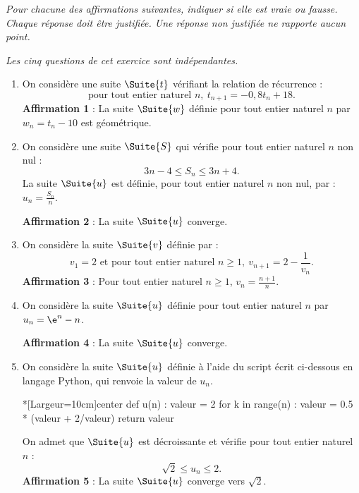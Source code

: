 \textit{Pour chacune des affirmations suivantes, indiquer si elle est vraie ou fausse. Chaque réponse doit être justifiée. Une réponse non justifiée ne rapporte aucun point.}

\smallskip

\textit{Les cinq questions de cet exercice sont indépendantes.}

\begin{enumerate}
	\item On considère une suite $\Suite{t}$ vérifiant la relation de récurrence : \[ \text{pour tout entier naturel } n,~t_{n+1}=-0,8t_n+18. \]
	\textbf{Affirmation 1} : La suite $\Suite{w}$ définie pour tout entier naturel $n$ par $w_n=t_n-10$ est géométrique.
	
	\smallskip
	\item On considère une suite $\Suite{S}$ qui vérifie pour tout entier naturel $n$ non nul : \[ 3n-4 \leqslant S_n \leqslant 3n+4. \]
	La suite $\Suite{u}$ est définie, pour tout entier naturel $n$ non nul, par : $u_n=\frac{S_n}{n}$.
	
	\textbf{Affirmation 2} : La suite $\Suite{u}$ converge.
	
	\smallskip
	\item On considère la suite $\Suite{v}$ définie par :%
	\[ v_1=2 \text{ et pour tout entier naturel } n\geqslant1,~v_{n+1}=2-\frac{1}{v_n}. \]
	\textbf{Affirmation 3} : Pour tout entier naturel $n \geqslant 1$, $v_{n}=\frac{n+1}{n}$.
	
	\smallskip
	\item On considère la suite $\Suite{u}$ définie pour tout entier naturel $n$ par $u_n = \e^n-n$.
	
	\textbf{Affirmation 4} : La suite $\Suite{u}$ converge.
	
	\smallskip
	\item On considère la suite $\Suite{u}$ définie à l'aide du script écrit ci-dessous en langage \textsf{Python}, qui renvoie la valeur de $u_n$.
	
\begin{CodePythonLstAlt}*[Largeur=10cm]{center}
def u(n) :
	valeur = 2
	for k in range(n) :
		valeur = 0.5 * (valeur + 2/valeur)
	return valeur
\end{CodePythonLstAlt}

	On admet que $\Suite{u}$ est décroissante et vérifie pour tout entier naturel $n$ : \[ \sqrt{2} \leqslant u_n \leqslant 2. \]
	\textbf{Affirmation 5} : La suite $\Suite{u}$ converge vers $\sqrt{2}$.
\end{enumerate}